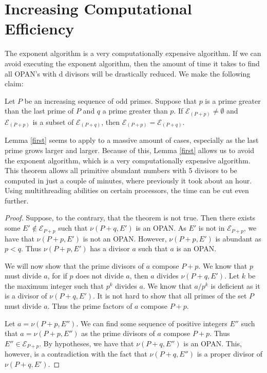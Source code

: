 \documentclass[../paper.tex]{subfiles}
\begin{document}
\section{Increasing Computational Efficiency}

The exponent algorithm is a very computationally expensive
algorithm. If we can avoid executing the exponent algorithm, then
the amount of time it takes to find all OPAN's with d divisors will
be drastically reduced. 
We make the following claim:

\begin{lem}\label{first}
Let $P$ be an increasing sequence of odd primes. Suppose
that $p$ is a prime greater than the last prime of $P$ and $q$ a
prime greater than $p$. If $\mathcal{E}_{(P + p)} \neq 
\emptyset$ and $\mathcal{E}_{(P + p)}$ is a subset of 
$\mathcal{E}_{(P + q)}$, then $\mathcal{E}_{(P + p)} = 
\mathcal{E}_{(P + q)}$.
\end{lem}

Lemma {\ref{first}} seems to apply to a massive amount of cases,
especially as the last prime grows larger and larger. Because of
this, Lemma {\ref{first}} allows us to avoid the exponent algorithm,
which is a very computationally expensive algorithm. This theorem
allows all primitive abundant numbers with 5 divisors to be
computed in just a couple of minutes, where previously it took
about an hour. Using multithreading abilities on certain
processors, the time can be cut even further.


\begin{proof}
  Suppose, to the contrary, that the theorem is not true. Then
there exists some $E' \notin \mathcal{E}_{P + p}$ such that $\nu
(P + q, E')$ is an OPAN. As $E'$ is not in $\mathcal{E}_{P + p}$,
we have that $\nu (P + p, E')$ is not an OPAN. However, $\nu (P +
p, E')$ is abundant as $p < q$. Thus $\nu (P + p, E')$ has a
divisor $a$ such that $a$ is an OPAN. 

  We will now show that the prime divisors of $a$ compose $P + p$.
We know that $p$ must divide $a$, for if $p$ does not divide $a$,
then $a$ divides $\nu (P + q, E')$. Let $k$ be the maximum
integer such that $p^k$ divides $a$. We know that $a / p^k$ is
deficient as it is a divisor of $\nu (P + q, E')$. It is not hard
to show that all primes of the set $P$ must divide $a$. Thus the
prime factors of $a$ compose $P + p$. 

  Let $a = \nu(P + p, E'')$. We can find some sequence of positive
integers $E''$ such that $a = \nu (P + p, E'')$ as the prime divisors
of $a$ compose $P + p$. Thus $E'' \in \mathcal{E}_{P + p}$. By
hypotheses, we have that $\nu(P + q, E'')$ is an OPAN. This,
however, is a contradiction with the fact that $\nu(P + q, E'')$
is a proper divisor of $\nu(P + q, E')$.
\end{proof}
\end{document}
